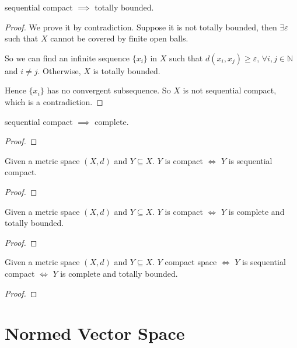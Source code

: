 \begin{lemma}
sequential compact $\implies$ totally bounded. 
\end{lemma}

\begin{proof}
We prove it by contradiction. Suppose it is not totally bounded, then $\exists \varepsilon$ such that $X$ cannot be covered by finite open balls.

So we can find an infinite sequence $\{x_i\}$ in $X$ such that $d(x_i, x_j) \geq \varepsilon$, $\forall i, j \in \mathbb{N}$ and $i \neq j$. Otherwise, $X$ is totally bounded.

Hence $\{x_i\}$ has no convergent subsequence. So $X$ is not sequential compact, which is a contradiction. 
\end{proof}

\begin{lemma}
sequential compact $\implies$ complete. 
\end{lemma}

\begin{proof}
\end{proof}

\begin{lemma}
Given a metric space $(X, d)$ and $Y \subseteq X$. $Y$ is compact $\iff$ $Y$ is sequential compact. 
\end{lemma}

\begin{proof}
\end{proof}

\begin{lemma}
Given a metric space $(X, d)$ and $Y \subseteq X$. $Y$ is compact $\iff$ $Y$ is complete and totally bounded. 
\end{lemma}

\begin{proof}
\end{proof}

\begin{theorem}
Given a metric space $(X, d)$ and $Y \subseteq X$. $Y$ compact space $\iff$ $Y$ is sequential compact $\iff$ $Y$ is complete and totally bounded. 
\end{theorem}

\begin{proof}
\end{proof}

\section{Normed Vector Space}

